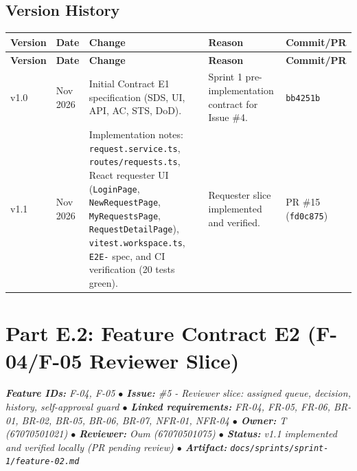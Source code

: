 \documentclass[11pt,a4paper]{article}
\begin{document}
\subsection{Version History}

\vspace{0.3em}
\begin{longtable}{|>{\centering\arraybackslash}p{1.2cm}|>{\centering\arraybackslash}p{1.8cm}|>{\RaggedRight}p{6.6cm}|>{\RaggedRight}p{3.2cm}|>{\centering\arraybackslash}p{1.6cm}|}
\hline
\rowcolor{zenPale}\textbf{Version} & \textbf{Date} & \textbf{Change} & \textbf{Reason} & \textbf{Commit/PR} \\ \hline
\endfirsthead
\hline
\rowcolor{zenPale}\textbf{Version} & \textbf{Date} & \textbf{Change} & \textbf{Reason} & \textbf{Commit/PR} \\ \hline
\endhead
\hline
\endfoot
v1.0 & 11 Nov 2026 & Initial Contract E1 specification (SDS, UI, API, AC, STS, DoD). & Sprint 1 pre-implementation contract for Issue \#4. & \texttt{bb4251b} \\ \hline
v1.1 & 11 Nov 2026 & Implementation notes: \texttt{request.\allowbreak service.\allowbreak ts}, \allowbreak\texttt{routes/\allowbreak requests.\allowbreak ts}, React requester UI (\texttt{LoginPage}, \allowbreak\texttt{NewRequestPage}, \allowbreak\texttt{MyRequestsPage}, \allowbreak\texttt{RequestDetailPage}), \texttt{vitest.\allowbreak workspace.\allowbreak ts}, \texttt{E2E-\allowbreak 01} spec, and CI verification (20 tests green). & Requester slice implemented and verified. & PR \#15 (\texttt{fd0c875}) \\ \hline
\end{longtable}
\vspace{0.3em}
\newpage
\section{Part E.2: Feature Contract E2 (F-04/F-05 Reviewer Slice)}\label{sec:part-e2}

\begin{tcolorbox}[colback=lightbg,colframe=secondary,arc=2mm,boxrule=0.8pt]\small\itshape
\textbf{Feature IDs:} F-04, F-05 \quad $\bullet$ \quad \textbf{Issue:} \#5 - Reviewer slice: assigned queue, decision, history, self-approval guard \quad $\bullet$ \quad \textbf{Linked requirements:} FR-04, FR-05, FR-06, BR-01, BR-02, BR-05, BR-06, BR-07, NFR-01, NFR-04 \quad $\bullet$ \quad \textbf{Owner:} T (67070501021) \quad $\bullet$ \quad \textbf{Reviewer:} Oum (67070501075) \quad $\bullet$ \quad \textbf{Status:} v1.1 implemented and verified locally (PR pending review) \quad $\bullet$ \quad \textbf{Artifact:} \texttt{docs/sprints/sprint-1/feature-02.md}
\end{tcolorbox}
\end{document}
